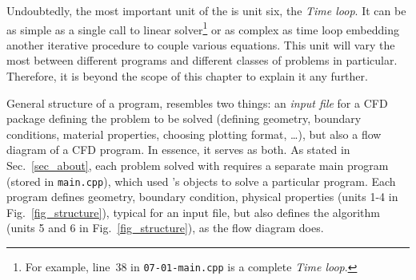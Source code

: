 Undoubtedly, the most important unit of the {\psiboil} is unit six,
the {\em Time loop}. It can be as simple as a single call to linear
solver\footnote{For example, line~38 in {\tt 07-01-main.cpp} is a complete
{\em Time loop}.} or as complex as time loop embedding another 
iterative procedure to couple various equations. This unit will vary
the most between different programs and different classes of problems
in particular. Therefore, it is beyond the scope of this chapter to
explain it any further. 

General structure of a {\psiboil} program, resembles two things: an
{\em input file} for a CFD package defining the problem to be solved 
(defining geometry, boundary conditions, material properties, choosing
plotting format, \dots), but also a flow diagram of a CFD program. 
In essence, it serves as both. As stated in Sec.~\ref{sec_about},
each problem solved with {\psiboil} requires a separate main program
(stored in {\tt main.cpp}), which used {\psiboil}'s objects to solve
a particular program. Each program defines geometry, boundary condition,
physical properties (units 1-4 in Fig.~\ref{fig_structure}), typical for 
an input file, but also defines the algorithm (units 5 and 6 
in Fig.~\ref{fig_structure}), as the flow diagram does. 
%

\vspace*{5mm}  %
